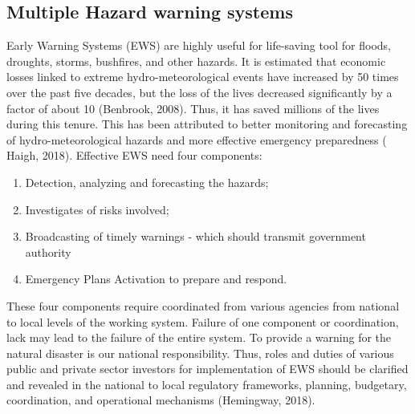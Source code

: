 \subsection{Multiple Hazard warning systems}\label{multiple harzard warning systems}
Early Warning Systems (EWS) are highly useful for life-saving tool for floods, droughts, storms, bushfires, and other hazards.  It is estimated that economic losses linked to extreme hydro-meteorological events have increased  by 50 times over the past five decades, but the loss of the lives decreased significantly by a factor of about 10 (Benbrook, 2008). Thus, it has saved millions of the lives during this tenure. This has been attributed to better monitoring and forecasting of hydro-meteorological hazards and more effective emergency preparedness ( Haigh, 2018).
Effective EWS need four components:
\begin{enumerate}
\item Detection, analyzing and forecasting the hazards;
\item Investigates of risks involved;
\item Broadcasting of timely warnings - which should transmit  government authority
\item  Emergency Plans Activation to prepare and respond.
\end{enumerate}
These four components require coordinated from various agencies from national to local levels of the working system.  Failure of one  component or coordination, lack may lead to the failure of the entire system. To provide a warning for the natural disaster is our national responsibility. Thus, roles and duties of various public and private sector investors for implementation of EWS should be clarified and revealed in the national to local regulatory frameworks, planning, budgetary, coordination, and operational mechanisms (Hemingway, 2018).

